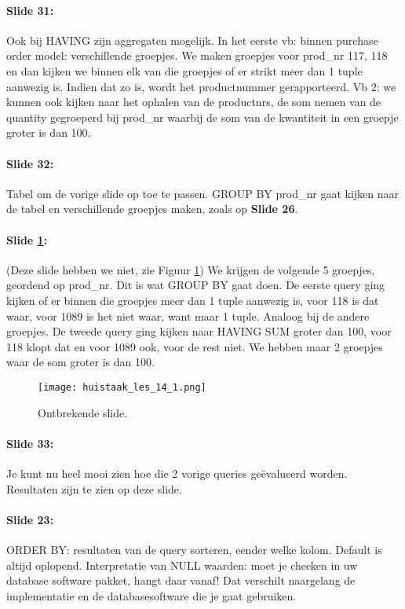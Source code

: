 \documentclass[10pt,a4paper]{report}
\begin{document}
\paragraph{Slide 31:}Ook bij HAVING zijn aggregaten mogelijk. In het eerste vb: binnen purchase order model: verschillende groepjes. We maken groepjes voor prod\_nr 117, 118 en dan kijken we binnen elk van die groepjes of er strikt meer dan 1 tuple aanwezig is. Indien dat zo is, wordt het productnummer gerapporteerd. Vb 2: we kunnen ook kijken naar het ophalen van de productnrs, de som nemen van de quantity gegroeperd bij prod\_nr waarbij de som van de kwantiteit in een groepje groter is dan 100.

\paragraph{Slide 32:}Tabel om de vorige slide op toe te passen. GROUP BY prod\_nr gaat kijken naar de tabel en verschillende groepjes maken, zoals op \textbf{Slide 26}.


\paragraph{Slide \ref{huistaak_img1}:} (Deze slide hebben we niet, zie Figuur \ref{huistaak_img1}) We krijgen de volgende 5 groepjes, geordend op prod\_nr. Dit is wat GROUP BY gaat doen. De eerste query ging kijken of er binnen die groepjes meer dan 1 tuple aanwezig is, voor 118 is dat waar, voor 1089 is het niet waar, want maar 1 tuple. Analoog bij de andere groepjes.
De tweede query ging kijken naar HAVING SUM groter dan 100, voor 118 klopt dat en voor 1089 ook, voor de rest niet. We hebben maar 2 groepjes waar de som groter is dan 100. 

\begin{figure}[ht!]
\centering
\texttt{[image: huistaak\_les\_14\_1.png]}
\caption{Ontbrekende slide. \label{huistaak_img1}}
\end{figure}

\paragraph{Slide 33:}Je kunt nu heel mooi zien hoe die 2 vorige queries geëvalueerd worden. Resultaten zijn te zien op deze slide.

\paragraph{Slide 23:}ORDER BY: resultaten van de query sorteren, eender welke kolom. Default is altijd oplopend. Interpretatie van NULL waarden: moet je checken in uw database software pakket, hangt daar vanaf! Dat verschilt naargelang de implementatie en de databasesoftware die je gaat gebruiken.
\end{document}
